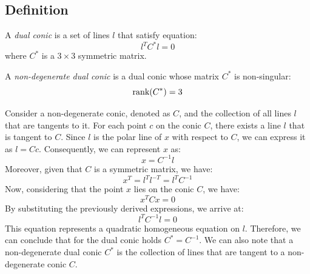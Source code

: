 \documentclass[12pt, a4paper]{report}
\begin{document}
    \subsection{Definition}
    \begin{definition}
        A \emph{dual conic} is a set of lines $l$ that satisfy equation:
        \[l^TC^{*}l=0\]
        where $C^{*}$ is a $3 \times 3$ symmetric matrix.

        A \emph{non-degenerate dual conic} is a dual conic whose matrix $C^{*}$ is non-singular: 
        \[\textnormal{rank}(C^{*})=3\]
    \end{definition}
    Consider a non-degenerate conic, denoted as $C$, and the collection of all lines $l$ that are tangents to it.
    For each point $c$ on the conic $C$, there exists a line $l$ that is tangent to $C$. 
    Since $l$ is the polar line of $x$ with respect to $C$, we can express it as $l=Cc$.
    Consequently, we can represent $x$ as:
    \[x=C^{-1}l\]
    Moreover, given that $C$ is a symmetric matrix, we have:
    \[x^T=l^Tl^{-T}=l^TC^{-1}\]
    Now, considering that the point $x$ lies on the conic $C$, we have:
    \[x^TCx=0\]
    By substituting the previously derived expressions, we arrive at:
    \[l^TC^{-1}l=0\]
    This equation represents a quadratic homogeneous equation on $l$. 
    Therefore, we can conclude that for the dual conic holds $C^{*}=C^{-1}$. 
    We can also note that a non-degenerate dual conic $C^{*}$ is the collection of lines that are tangent to a non-degenerate conic $C$.
\end{document}
